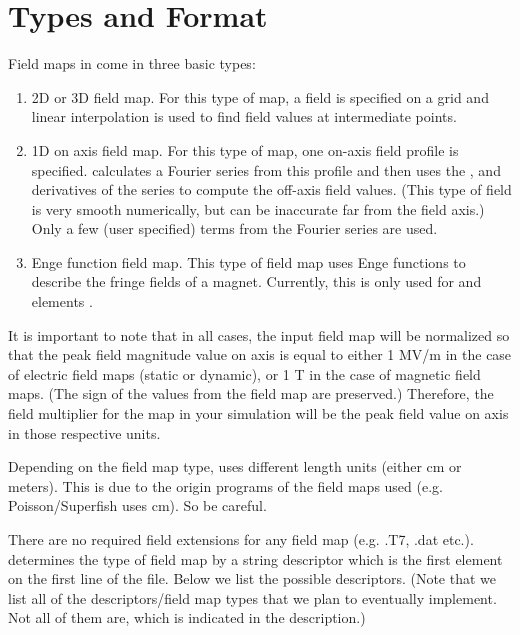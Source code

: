 \section{Types and Format}
\label{sec:fieldmaps}
Field maps in \opalt come in three basic types:

\begin{enumerate}
\item 2D or 3D field map. For this type of map, a field is specified on a grid and linear interpolation is used to find field
  values at intermediate points.
\item 1D on axis field map. For this type of map, one on-axis field profile is specified. \opalt calculates a Fourier series
  from this profile and then uses the ,  and  derivatives of the series to
  compute the off-axis field values. (This type of field is very smooth numerically, but can be inaccurate far from the
  field axis.) Only a few (user specified) terms from the Fourier series are used.
\item Enge function \cite{enge} field map. This type of field map uses Enge functions to describe the fringe fields of
  a magnet. Currently, this is only used for  and  elements .
\end{enumerate}
It is important to note that in all cases, the input field map will be normalized so that the peak field magnitude value on axis is equal
to either 1 MV/m in the case of electric field maps (static or dynamic), or 1 T in the case of magnetic field maps. (The sign
of the values from the field map are preserved.) Therefore,
the field multiplier for the map in your simulation will be the peak field value on axis in those respective units.

Depending on the field map type, \opalt uses different length units (either cm or meters). This is due to the origin programs
of the field maps used (e.g. Poisson/Superfish \cite{superfish} uses cm). So be careful.

There are no required field extensions for any \opalt field map (e.g. .T7, .dat etc.). \opalt determines the type of field
map by a string descriptor which is the first element on the first line of the file. Below we list the possible descriptors.
(Note that we list all of the descriptors/field map types that we plan to eventually implement. Not all of them are, which
is indicated in the description.)

